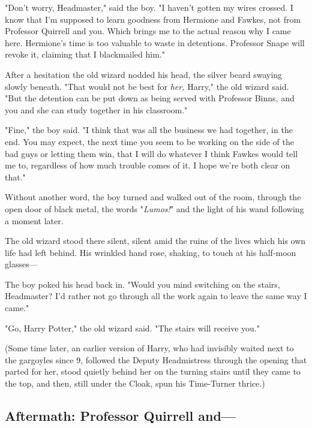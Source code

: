 "Don't worry, Headmaster," said the boy. "I haven't gotten my wires crossed. I 
know that I'm supposed to learn goodness from Hermione and Fawkes, not from 
Professor Quirrell and you. Which brings me to the actual reason why I came 
here. Hermione's time is too valuable to waste in detentions. Professor Snape 
will revoke it, claiming that I blackmailed him."

After a hesitation the old wizard nodded his head, the silver beard swaying 
slowly beneath. "That would not be best for \emph{her,} Harry," the old wizard 
said. "But the detention can be put down as being served with Professor Binns, 
and you and she can study together in his classroom."

"Fine," the boy said. "I think that was all the business we had together, in 
the end. You may expect, the next time you seem to be working on the side of 
the bad guys or letting them win, that I will do whatever I think Fawkes would 
tell me to, regardless of how much trouble comes of it. I hope we're both clear 
on that."

Without another word, the boy turned and walked out of the room, through the 
open door of black metal, the words "\emph{Lumos!}" and the light of his wand 
following a moment later.

The old wizard stood there silent, silent amid the ruins of the lives which his 
own life had left behind. His wrinkled hand rose, shaking, to touch at his 
half-moon glasses---

The boy poked his head back in. "Would you mind switching on the stairs, 
Headmaster? I'd rather not go through all the work again to leave the same way 
I came."

"Go, Harry Potter," the old wizard said. "The stairs will receive you."

(Some time later, an earlier version of Harry, who had invisibly waited next to 
the gargoyles since 9\PM, followed the Deputy Headmistress through the opening 
that parted for her, stood quietly behind her on the turning stairs until they 
came to the top, and then, still under the Cloak, spun his Time-Turner thrice.)
\sbreak
\vspace{-2\baselineskip}
\subsection{Aftermath: Professor Quirrell and---}

